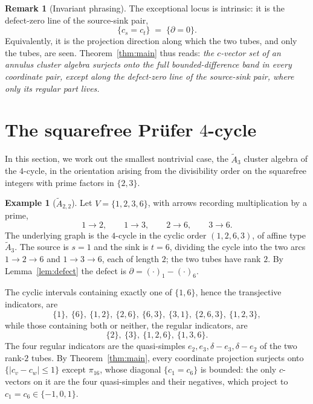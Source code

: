 \documentclass[11pt, a4paper]{amsart}
\theoremstyle{definition}
\newtheorem{example}[theorem]{Example}
\newtheorem{remark}[theorem]{Remark}
\begin{document}
\begin{remark}[Invariant phrasing]
\label{rem:invariant}
The exceptional locus is intrinsic: it is the defect-zero line of the
source-sink pair,
\[
  \{c_s = c_t\} \;=\; \{\partial = 0\}.
\]
Equivalently, it is the projection direction along which the two tubes,
and only the tubes, are seen. Theorem~\ref{thm:main} thus reads: \emph{the
$c$-vector set of an annulus cluster algebra surjects onto the full
bounded-difference band in every coordinate pair, except along the
defect-zero line of the source-sink pair, where only its regular part
lives.}
\end{remark}

\section{The squarefree Pr\"ufer \texorpdfstring{$4$}{4}-cycle}
\label{sec:example}

In this section, we work out the smallest nontrivial case, the
$\widetilde{A}_3$ cluster algebra of the $4$-cycle, in the orientation
arising from the divisibility order on the squarefree integers with prime
factors in $\{2, 3\}$.

\begin{example}[$\widetilde{A}_{2,2}$]
\label{ex:prufer}
Let $V = \{1, 2, 3, 6\}$, with arrows recording multiplication by a
prime,
\[
  1 \to 2, \qquad 1 \to 3, \qquad 2 \to 6, \qquad 3 \to 6.
\]
The underlying graph is the $4$-cycle in the cyclic order
$(1, 2, 6, 3)$, of affine type $\widetilde{A}_3$. The source is $s = 1$
and the sink is $t = 6$, dividing the cycle into the two arcs $1 \to 2
\to 6$ and $1 \to 3 \to 6$, each of length $2$; the two tubes have rank
$2$. By Lemma~\ref{lem:defect} the defect is $\partial = (\cdot)_1 -
(\cdot)_6$.

The cyclic intervals containing exactly one of $\{1, 6\}$, hence the
transjective indicators, are
\[
  \{1\},\ \{6\},\ \{1, 2\},\ \{2, 6\},\ \{6, 3\},\ \{3, 1\},\
  \{2, 6, 3\},\ \{1, 2, 3\},
\]
while those containing both or neither, the regular indicators, are
\[
  \{2\},\ \{3\},\ \{1, 2, 6\},\ \{1, 3, 6\}.
\]
The four regular indicators are the quasi-simples $e_2, e_3, \delta -
e_3, \delta - e_2$ of the two rank-$2$ tubes. By
Theorem~\ref{thm:main}, every coordinate projection surjects onto
$\{|c_v - c_w| \leq 1\}$ except $\pi_{16}$, whose diagonal $\{c_1 = c_6\}$
is bounded: the only $c$-vectors on it are the four quasi-simples and their
negatives, which project to $c_1 = c_6 \in \{-1, 0, 1\}$.
\end{example}
\end{document}
